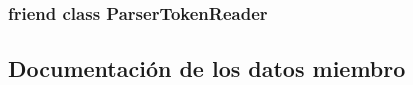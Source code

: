 \subsubsection[{\texorpdfstring{Parser\+Token\+Reader}{ParserTokenReader}}]{\setlength{\rightskip}{0pt plus 5cm}friend class {\bf Parser\+Token\+Reader}\hspace{0.3cm}{\ttfamily [friend]}}\hypertarget{classmu_1_1_parser_base_a4a4908a2dc2cc3723b45602a3e722f79}{}\label{classmu_1_1_parser_base_a4a4908a2dc2cc3723b45602a3e722f79}


\subsection{Documentación de los datos miembro}
